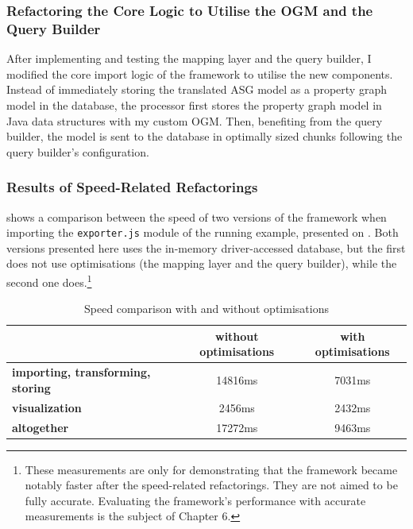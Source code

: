 \subsubsection{Refactoring the Core Logic to Utilise the OGM and the Query Builder}

After implementing and testing the mapping layer and the query builder, I modified the core import logic of the framework to utilise the new components. Instead of immediately storing the translated ASG model as a property graph model in the database, the processor first stores the property graph model in Java data structures with my custom OGM. Then, benefiting from the query builder, the model is sent to the database in optimally sized chunks following the query builder's configuration.


\subsubsection{Results of Speed-Related Refactorings}

 shows a comparison between the speed of two versions of the framework when importing the \texttt{exporter.js} module of the running example, presented on . Both versions presented here uses the in-memory driver-accessed database, but the first does not use optimisations (the mapping layer and the query builder), while the second one does.\footnote{These measurements are only for demonstrating that the framework became notably faster after the speed-related refactorings. They are not aimed to be fully accurate. Evaluating the framework's performance with accurate measurements is the subject of Chapter 6.}

\begin{table}[!htb]
	\centering
	\begin{tabular}{l|cc}
		\toprule
																								&   \textbf{without optimisations}   &   \textbf{with optimisations}   \\
		\midrule
		\textbf{importing, transforming, storing}   &   14816ms                          &   7031ms                        \\
		\textbf{visualization}                      &   2456ms                           &   2432ms                        \\
		\midrule
		\textbf{altogether}                         &   17272ms                          &   9463ms                        \\
		\bottomrule
	\end{tabular}

	\caption{Speed comparison with and without optimisations}
	\label{table:results-of-query-optimisations}
\end{table}


